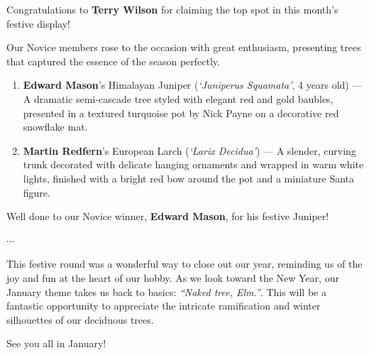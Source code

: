 \noindent
Congratulations to \textbf{Terry Wilson} for claiming the top spot in this month's festive display!

\medskip
{}
\noindent
Our Novice members rose to the occasion with great enthusiasm, presenting trees that captured the essence of the season perfectly.

\begin{enumerate}
    \item \textbf{Edward Mason}'s Himalayan Juniper (\textit{`Juniperus Squamata'}, 4 years old) --- A dramatic semi\--cascade tree styled with elegant red and gold baubles, presented in a textured turquoise pot by Nick Payne on a decorative red snowflake mat.
    \item \textbf{Martin Redfern}'s European Larch (\textit{`Larix Decidua'}) --- A slender, curving trunk decorated with delicate hanging ornaments and wrapped in warm white lights, finished with a bright red bow around the pot and a miniature Santa figure.
\end{enumerate}

\noindent
Well done to our Novice winner, \textbf{Edward Mason}, for his festive Juniper!

\vspace*{-0.5em}
\begin{center}
$\cdots$
\end{center}
\vspace*{-0.5em}

\noindent
This festive round was a wonderful way to close out our year, reminding us of the joy and fun at the heart of our hobby.
As we look toward the New Year, our January theme takes us back to basics: \textit{``Naked tree, Elm.''}.
This will be a fantastic opportunity to appreciate the intricate ramification and winter silhouettes of our deciduous trees.

See you all in January!
\closearticle
{}

